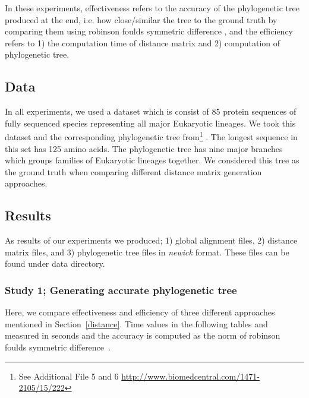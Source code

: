 \documentclass[11pt,letterpaper]{article}
\theoremstyle{definition}
\begin{document}
In these experiments, effectiveness refers to the accuracy of the phylogenetic tree produced at the end, i.e. how close/similar the tree to the ground truth by comparing them using robinson foulds symmetric difference \cite{robinson1981comparison}, and the efficiency refers to 1) the computation time of distance matrix and 2) computation of phylogenetic tree.

\subsection{Data}

In all experiments, we used a dataset which is consist of 85 protein sequences of fully sequenced species representing all major Eukaryotic lineages. We took this dataset and the corresponding phylogenetic tree from\footnote{See Additional File 5 and 6 \url{http://www.biomedcentral.com/1471-2105/15/222}} \cite{khafif2014identification}. The longest sequence in this set has 125 amino acids. The phylogenetic tree has nine major branches which groups families of Eukaryotic lineages together. We considered this tree as the ground truth when comparing different distance matrix generation approaches.

\subsection{Results}

As results of our experiments we produced; 1) global alignment files, 2) distance matrix files, and 3) phylogenetic tree files in \textit{newick} format. These files can be found under data directory. 

\subsubsection{Study 1; Generating accurate phylogenetic tree}

Here, we compare effectiveness and efficiency of three different approaches mentioned in Section~\ref{distance}. Time values in the following tables and measured in seconds and the accuracy is computed as the norm of robinson foulds symmetric difference~\cite{robinson1981comparison}. 
\end{document}
